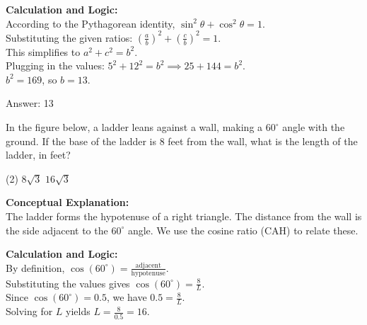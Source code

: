 \documentclass[11pt,paper=a4,answers]{exam}
\begin{document}
\begin{questions}
\begin{solution}
\vspace{10pt}
\textbf{Calculation and Logic:} \\
According to the Pythagorean identity, $\sin^2 \theta + \cos^2 \theta = 1$. \\
Substituting the given ratios: $(\frac{a}{b})^2 + (\frac{c}{b})^2 = 1$. \\
This simplifies to $a^2 + c^2 = b^2$. \\
Plugging in the values: $5^2 + 12^2 = b^2 \implies 25 + 144 = b^2$. \\
$b^2 = 169$, so $b = 13$.

\vspace{15pt}
Answer: \colorbox{yellow!100}{13}
\end{solution}



\question
In the figure below, a ladder leans against a wall, making a $60^\circ$ angle with the ground. If the base of the ladder is 8 feet from the wall, what is the length of the ladder, in feet?
\begin{center}
\end{center}
\begin{tasks}(2)
    \task $8\sqrt{3}$
    \task $16\sqrt{3}$
\end{tasks}

\begin{solution}
\textbf{Conceptual Explanation:} \\
The ladder forms the hypotenuse of a right triangle. The distance from the wall is the side adjacent to the $60^\circ$ angle. We use the cosine ratio (CAH) to relate these.

\vspace{10pt}
\textbf{Calculation and Logic:} \\
By definition, $\cos(60^\circ) = \frac{\text{adjacent}}{\text{hypotenuse}}$. \\
Substituting the values gives $\cos(60^\circ) = \frac{8}{L}$. \\
Since $\cos(60^\circ) = 0.5$, we have $0.5 = \frac{8}{L}$. \\
Solving for $L$ yields $L = \frac{8}{0.5} = 16$.


\end{solution}
\end{questions}
\end{document}
